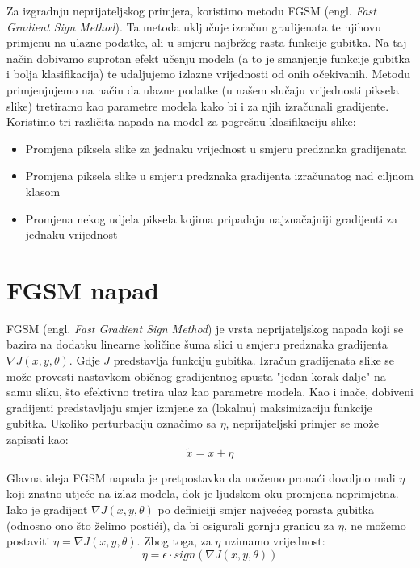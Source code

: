 Za izgradnju neprijateljskog primjera, koristimo metodu FGSM (engl. \textit{Fast Gradient Sign Method}). Ta metoda uključuje izračun gradijenata te njihovu primjenu na ulazne podatke, ali u smjeru najbržeg rasta funkcije gubitka. Na taj način dobivamo suprotan efekt učenju modela (a to je smanjenje funkcije gubitka i bolja klasifikacija) te udaljujemo izlazne vrijednosti od onih očekivanih. Metodu primjenjujemo na način da ulazne podatke (u našem slučaju vrijednosti piksela slike) tretiramo kao parametre modela kako bi i za njih izračunali gradijente. \\

Koristimo tri različita napada na model za pogrešnu klasifikaciju slike: 
\begin{itemize}
    \item Promjena piksela slike za jednaku vrijednost u smjeru predznaka gradijenata
    \item Promjena piksela slike u smjeru predznaka gradijenta izračunatog nad ciljnom klasom
    \item Promjena nekog udjela piksela kojima pripadaju najznačajniji gradijenti za jednaku vrijednost
\end{itemize}

\section{FGSM napad}

FGSM (engl. \textit{Fast Gradient Sign Method}) je vrsta neprijateljskog napada koji se bazira na dodatku linearne količine šuma slici u smjeru predznaka gradijenta $\nabla J(x, y, \theta)$. Gdje $J$ predstavlja funkciju gubitka. Izračun gradijenata slike se može provesti nastavkom običnog gradijentnog spusta "jedan korak dalje" na samu sliku, što efektivno tretira ulaz kao parametre modela. Kao i inače, dobiveni gradijenti predstavljaju smjer izmjene za (lokalnu) maksimizaciju funkcije gubitka. Ukoliko perturbaciju označimo sa $\eta$, neprijateljski primjer se može zapisati kao: 
\[\widetilde{x} = x + \eta\]

Glavna ideja FGSM napada je pretpostavka da možemo pronaći dovoljno mali $\eta$ koji znatno utječe na izlaz modela, dok je ljudskom oku promjena neprimjetna. Iako je gradijent $\nabla J(x, y, \theta)$ po definiciji smjer najvećeg porasta gubitka (odnosno ono što želimo postići), da bi osigurali gornju granicu za $\eta$, ne možemo postaviti $\eta = \nabla J(x, y, \theta)$. Zbog toga, za $\eta$ uzimamo vrijednost: 
\[\eta = \epsilon \cdot sign\left(\nabla J(x, y, \theta)\right)\]

